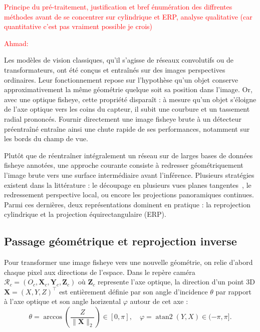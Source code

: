 \documentclass[11pt,a4paper]{article}
\begin{document}
\textcolor{red}{Principe du pré-traitement, justification et bref énumération des diffrentes méthodes avant de se concentrer sur cylindrique et ERP, analyse qualitative (car quantitative c'est pas vraiment possible je crois)}

\textcolor{red}{Ahmad:}

Les modèles de vision classiques, qu'il s'agisse de réseaux convolutifs ou de transformateurs, ont été conçus et entraînés sur des images perspectives ordinaires. Leur fonctionnement repose sur l'hypothèse qu'un objet conserve approximativement la même géométrie quelque soit sa position dans l'image. Or, avec une optique fisheye, cette propriété disparaît : à mesure qu'un objet s'éloigne de l'axe optique vers les coins du capteur, il subit une courbure et un tassement radial prononcés. Fournir directement une image fisheye brute à un détecteur préentraîné entraîne ainsi une chute rapide de ses performances, notamment sur les bords du champ de vue.

Plutôt que de réentraîner intégralement un réseau sur de larges bases de données fisheye annotées, une approche courante consiste à redresser géométriquement l'image brute vers une surface intermédiaire avant l'inférence. Plusieurs stratégies existent dans la littérature : le découpage en plusieurs vues planes tangentes~\cite{eder2020}, le redressement perspective local, ou encore les projections panoramiques continues. Parmi ces dernières, deux représentations dominent en pratique : la reprojection cylindrique et la projection équirectangulaire (ERP).

\subsection{Passage géométrique et reprojection inverse}

Pour transformer une image fisheye vers une nouvelle géométrie, on relie d'abord chaque pixel aux directions de l'espace. Dans le repère caméra $\mathcal{R}_c = (O_c, \mathbf{X}_c, \mathbf{Y}_c, \mathbf{Z}_c)$ où $\mathbf{Z}_c$ represente l'axe optique, la direction d'un point 3D $\mathbf{X} = (X, Y, Z)^\top$ est entièrement définie par son angle d'incidence $\theta$ par rapport à l'axe optique et son angle horizental $\varphi$ autour de cet axe :
\begin{equation}
\theta = \arccos\left(\frac{Z}{\|\mathbf{X}\|_2}\right) \in [0, \pi], \quad \varphi = \operatorname{atan2}(Y, X) \in (-\pi, \pi].
\end{equation}
\end{document}
